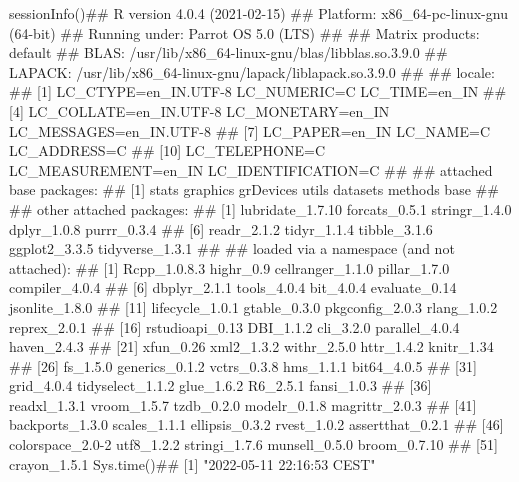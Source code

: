 \documentclass{article}\usepackage[]{graphicx}\usepackage[]{color}
\begin{document}
sessionInfo()## R version 4.0.4 (2021-02-15)
## Platform: x86_64-pc-linux-gnu (64-bit)
## Running under: Parrot OS 5.0 (LTS)
## 
## Matrix products: default
## BLAS:   /usr/lib/x86_64-linux-gnu/blas/libblas.so.3.9.0
## LAPACK: /usr/lib/x86_64-linux-gnu/lapack/liblapack.so.3.9.0
## 
## locale:
##  [1] LC_CTYPE=en_IN.UTF-8    LC_NUMERIC=C            LC_TIME=en_IN          
##  [4] LC_COLLATE=en_IN.UTF-8  LC_MONETARY=en_IN       LC_MESSAGES=en_IN.UTF-8
##  [7] LC_PAPER=en_IN          LC_NAME=C               LC_ADDRESS=C           
## [10] LC_TELEPHONE=C          LC_MEASUREMENT=en_IN    LC_IDENTIFICATION=C    
## 
## attached base packages:
## [1] stats     graphics  grDevices utils     datasets  methods   base     
## 
## other attached packages:
##  [1] lubridate_1.7.10 forcats_0.5.1    stringr_1.4.0    dplyr_1.0.8      purrr_0.3.4     
##  [6] readr_2.1.2      tidyr_1.1.4      tibble_3.1.6     ggplot2_3.3.5    tidyverse_1.3.1 
## 
## loaded via a namespace (and not attached):
##  [1] Rcpp_1.0.8.3     highr_0.9        cellranger_1.1.0 pillar_1.7.0     compiler_4.0.4  
##  [6] dbplyr_2.1.1     tools_4.0.4      bit_4.0.4        evaluate_0.14    jsonlite_1.8.0  
## [11] lifecycle_1.0.1  gtable_0.3.0     pkgconfig_2.0.3  rlang_1.0.2      reprex_2.0.1    
## [16] rstudioapi_0.13  DBI_1.1.2        cli_3.2.0        parallel_4.0.4   haven_2.4.3     
## [21] xfun_0.26        xml2_1.3.2       withr_2.5.0      httr_1.4.2       knitr_1.34      
## [26] fs_1.5.0         generics_0.1.2   vctrs_0.3.8      hms_1.1.1        bit64_4.0.5     
## [31] grid_4.0.4       tidyselect_1.1.2 glue_1.6.2       R6_2.5.1         fansi_1.0.3     
## [36] readxl_1.3.1     vroom_1.5.7      tzdb_0.2.0       modelr_0.1.8     magrittr_2.0.3  
## [41] backports_1.3.0  scales_1.1.1     ellipsis_0.3.2   rvest_1.0.2      assertthat_0.2.1
## [46] colorspace_2.0-2 utf8_1.2.2       stringi_1.7.6    munsell_0.5.0    broom_0.7.10    
## [51] crayon_1.5.1
Sys.time()## [1] "2022-05-11 22:16:53 CEST"
\end{document}
